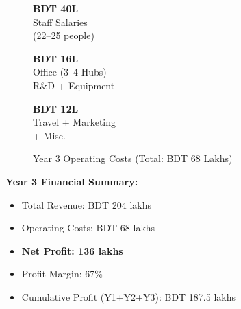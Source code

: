 \begin{figure}[H]
    \centering
    \noindent
    \begin{minipage}[t]{0.32\textwidth}
        \begin{tcolorbox}[colback=BoxBlue,colframe=SecondaryBlue,arc=5pt,boxrule=1pt,
            halign=center,top=6pt,bottom=6pt]
            {\large\bfseries\color{PrimaryBlue}BDT 40L}\\[2pt]
            {\small\color{DarkGrey}Staff Salaries\\(22--25 people)}
        \end{tcolorbox}
    \end{minipage}\hfill
    \begin{minipage}[t]{0.32\textwidth}
        \begin{tcolorbox}[colback=BoxBlue,colframe=SecondaryBlue,arc=5pt,boxrule=1pt,
            halign=center,top=6pt,bottom=6pt]
            {\large\bfseries\color{PrimaryBlue}BDT 16L}\\[2pt]
            {\small\color{DarkGrey}Office (3--4 Hubs)\\R\&D + Equipment}
        \end{tcolorbox}
    \end{minipage}\hfill
    \begin{minipage}[t]{0.32\textwidth}
        \begin{tcolorbox}[colback=BoxBlue,colframe=SecondaryBlue,arc=5pt,boxrule=1pt,
            halign=center,top=6pt,bottom=6pt]
            {\large\bfseries\color{PrimaryBlue}BDT 12L}\\[2pt]
            {\small\color{DarkGrey}Travel + Marketing\\+ Misc.}
        \end{tcolorbox}
    \end{minipage}
    \caption{Year 3 Operating Costs (Total: BDT 68 Lakhs)}
    \label{tab:year3_costs}
\end{figure}

\textbf{Year 3 Financial Summary:}
\begin{itemize}
    \item Total Revenue: BDT 204 lakhs
    \item Operating Costs: BDT 68 lakhs
    \item \textcolor{AccentGreen}{\textbf{Net Profit: 136 lakhs}}
    \item Profit Margin: 67\%
    \item Cumulative Profit (Y1+Y2+Y3): BDT 187.5 lakhs
\end{itemize}

